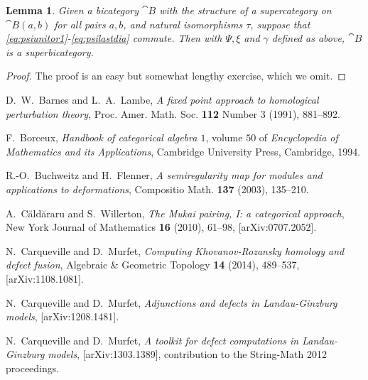 \documentclass[english,letter paper,12pt,leqno]{article}
\newtheorem{lemma}[theorem]{Lemma}
\theoremstyle{example}
\numberwithin{equation}{section}
\begin{document}
\begin{lemma}\label{lemma:constructingsuper}
Given a bicategory $\cat{B}$ with the structure of a supercategory on $\cat{B}(a,b)$ for all pairs $a,b$, and natural isomorphisms $\tau$, suppose that \eqref{eq:psiunitor1}-\eqref{eq:psilastdia} commute. Then with $\Psi, \xi$ and $\gamma$ defined as above, $\cat{B}$ is a superbicategory.
\end{lemma}
\begin{proof}
The proof is an easy but somewhat lengthy exercise, which we omit.
\end{proof}


\providecommand{\bysame}{\leavevmode\hbox to3em{\hrulefill}\thinspace}
\providecommand{\href}[2]{#2}
\begin{thebibliography}{BHLS03}


D.~W.~Barnes and L.~A.~Lambe, \emph{A fixed point approach to homological perturbation theory}, Proc. Amer.
  Math. Soc. \textbf{112} Number 3 (1991), 881--892.

F.~Borceux, \textsl{Handbook of categorical algebra $1$}, volume $50$ of \textsl{Encyclopedia of Mathematics and its Applications}, Cambridge University Press, Cambridge, 1994.

R.-O.~Buchweitz and H.~Flenner, \textsl{A semiregularity map for modules and applications to deformations}, Compositio Math. \textbf{137} (2003), 135--210.
    
A.~{C\u ald\u araru} and S.~Willerton, \textsl{The Mukai pairing, I: a categorical approach},
New York Journal of Mathematics \textbf{16} (2010), 61--98, 
  \href{http://arxiv.org/abs/0707.2052}{[arXiv:0707.2052]}.

N.~Carqueville and D.~Murfet, \textsl{Computing {K}hovanov-{R}ozansky homology and defect fusion}, Algebraic \& Geometric Topology \textbf{14} (2014), 489--537, \href{http://arxiv.org/abs/1108.1081}{[arXiv:1108.1081]}. 

N.~Carqueville and D.~Murfet, \textsl{Adjunctions and defects in {L}andau-{G}inzburg models}, \href{http://arxiv.org/abs/1208.1481}{[arXiv:1208.1481]}.

N.~Carqueville and D.~Murfet, \textsl{A toolkit for defect computations in Landau-Ginzburg models}, \href{http://arxiv.org/abs/1303.1389}{[arXiv:1303.1389]}, contribution to the String-Math 2012 proceedings.


\end{thebibliography}
\end{document}
